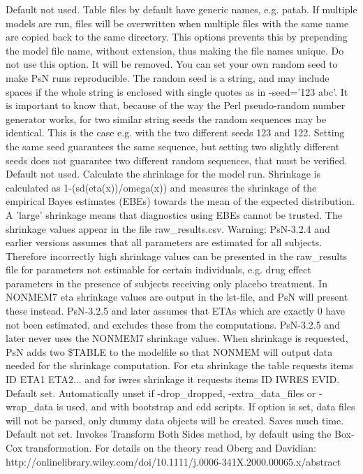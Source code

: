\begin{optionlist}
\nextopt
{}
Default not used. Table files by default have generic names, e.g. patab. If multiple models are run, files will be overwritten when multiple files with the same name are copied back to the same directory. This options prevents this by prepending the model file name, without extension, thus making the file names unique. 
\nextopt
{}
Do not use this option. It will be removed.
\nextopt
{}
You can set your own random seed to make PsN runs reproducible.
The random seed is a string, and may include spaces if the whole string is enclosed with single
quotes as in -seed='123 abc'. It is important to know that, because of the way the Perl pseudo-random
number generator works, for two similar string seeds the random sequences may be identical. 
This is the case e.g. with the two different seeds 123 and 122. 
Setting the same seed guarantees the same sequence, but setting two slightly different 
seeds does not guarantee two different random sequences, that must be verified.
\nextopt
{}
Default not used. Calculate the shrinkage for the model run.  Shrinkage is calculated as 1-(sd(eta(x))/omega(x)) and measures the shrinkage of the empirical Bayes estimates (EBEs) towards the mean of the expected distribution.  A 'large' shrinkage means that diagnostics using EBEs cannot be trusted. The shrinkage values appear in the file raw\_results.csv. Warning: PsN-3.2.4 and earlier versions assumes that all parameters are estimated for all subjects. Therefore incorrectly high shrinkage values can be presented in the raw\_results file for parameters not estimable for certain individuals, e.g. drug effect parameters in the presence of subjects receiving only placebo treatment. In NONMEM7 eta shrinkage values are output in the lst-file, and PsN will present these instead. PsN-3.2.5 and later assumes that ETAs which are exactly 0 have not been estimated, and excludes these from the computations. PsN-3.2.5 and later never uses the NONMEM7 shrinkage values. When shrinkage is requested, PsN adds two \$TABLE to the modelfile so that NONMEM will output data needed for the shrinkage computation. For eta shrinkage the table requests items ID ETA1 ETA2... and for iwres shrinkage it requests items ID IWRES EVID. 
\nextopt
{}
Default set. Automatically unset if -drop\_dropped, -extra\_data\_files or -wrap\_data is used, and with bootstrap and cdd scripts. If option is set, data files will not be parsed, only dummy data objects will be created. Saves much time. 
\nextopt
{}
Default not set. Invokes Transform Both Sides method, by default using the Box-Cox transformation. For details on the theory read Oberg and Davidian: http://onlinelibrary.wiley.com/doi/10.1111/j.0006-341X.2000.00065.x/abstract


\end{optionlist}
